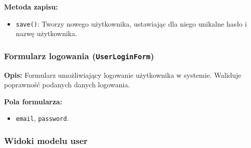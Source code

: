 \documentclass[12pt,a4paper,oneside]{article}
\theoremstyle{definition}
\numberwithin{equation}{section}
\begin{document}
\textbf{Metoda zapisu:}
\begin{itemize}
    \item \texttt{save()}: Tworzy nowego użytkownika, ustawiając dla niego unikalne hasło i nazwę użytkownika.
\end{itemize}

\subsubsection*{Formularz logowania (\texttt{UserLoginForm})}

\textbf{Opis:}  
Formularz umożliwiający logowanie użytkownika w systemie. Waliduje poprawność podanych danych logowania.

\textbf{Pola formularza:}
\begin{itemize}
    \item \texttt{email}, \texttt{password}.
\end{itemize}

\subsubsection{Widoki modelu user}
\end{document}
